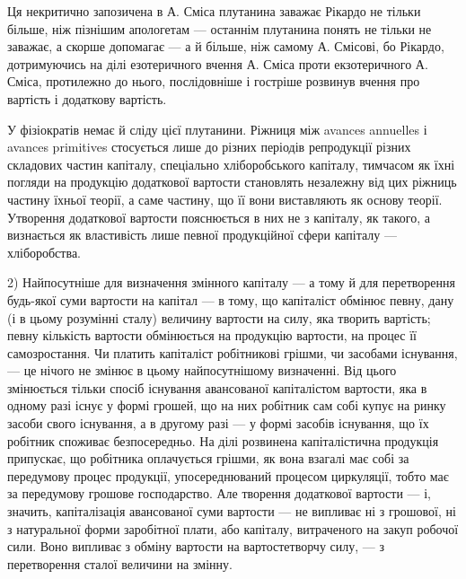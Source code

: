 
Ця некритично запозичена в А. Сміса плутанина заважає Рікардо
не тільки більше, ніж пізнішим апологетам — останнім плутанина понять
не тільки не заважає, а скорше допомагає — а й більше, ніж самому
А. Смісові, бо Рікардо, дотримуючись на ділі езотеричного вчення
А. Сміса проти екзотеричного А. Сміса, протилежно до нього, послідовніше
і гостріше розвинув вчення про вартість і додаткову вартість.

У фізіократів немає й сліду цієї плутанини. Ріжниця між avances
annuelles і avances primitives стосується лише до різних періодів репродукції
різних складових частин капіталу, спеціально хліборобського капіталу,
тимчасом як їхні погляди на продукцію додаткової вартости становлять
незалежну від цих ріжниць частину їхньої теорії, а саме частину,
що її вони виставляють як основу теорії. Утворення додаткової вартости
пояснюється в них не з капіталу, як такого, а визнається як властивість
лише певної продукційної сфери капіталу — хліборобства.

2) Найпосутніше для визначення змінного капіталу — а тому й для
перетворення будь-якої суми вартости на капітал — в тому, що капіталіст
обмінює певну, дану (і в цьому розумінні сталу) величину вартости на
силу, яка творить вартість; певну кількість вартости обмінюється на продукцію
вартости, на процес її самозростання. Чи платить капіталіст робітникові
грішми, чи засобами існування, — це нічого не змінює в цьому
найпосутнішому визначенні. Від цього змінюється тільки спосіб існування
авансованої капіталістом вартости, яка в одному разі існує у формі грошей,
що на них робітник сам собі купує на ринку засоби свого існування,
а в другому разі — у формі засобів існування, що їх робітник
споживає безпосередньо. На ділі розвинена капіталістична продукція
припускає, що робітника оплачується грішми, як вона взагалі має собі
за передумову процес продукції, упосереднюваний процесом циркуляції,
тобто має за передумову грошове господарство. Але творення додаткової
вартости — і, значить, капіталізація авансованої суми вартости — не випливає
ні з грошової, ні з натуральної форми заробітної плати, або капіталу,
витраченого на закуп робочої сили. Воно випливає з обміну вартости
на вартостетворчу силу, — з перетворення сталої величини на змінну.

